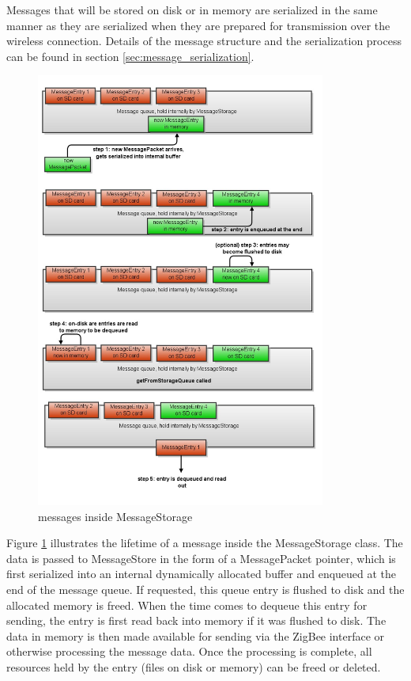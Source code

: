 Messages that will be stored on disk or in memory are serialized in the same manner as they are serialized when they are prepared for transmission over the wireless connection. Details of the message structure and the serialization process can be found in section \ref{sec:message_serialization}.

\begin{figure}[htb]
\centering
\includegraphics[width=0.85\textwidth]{Images/message_storage_lifecycle.jpg}
\caption{messages inside MessageStorage}
\label{fig:class_message_storage_dynamic}
\end{figure}

Figure \ref{fig:class_message_storage_dynamic} illustrates the lifetime of a message inside the MessageStorage class. The data is passed to MessageStore in the form of a MessagePacket pointer, which is first serialized into an internal dynamically allocated buffer and enqueued at the end of the message queue. If requested, this queue entry is flushed to disk and the allocated memory is freed. When the time comes to dequeue this entry for sending, the entry is first read back into memory if it was flushed to disk. The data in memory is then made available for sending via the ZigBee interface or otherwise processing the message data. Once the processing is complete, all resources held by the entry (files on disk or memory) can be freed or deleted.

